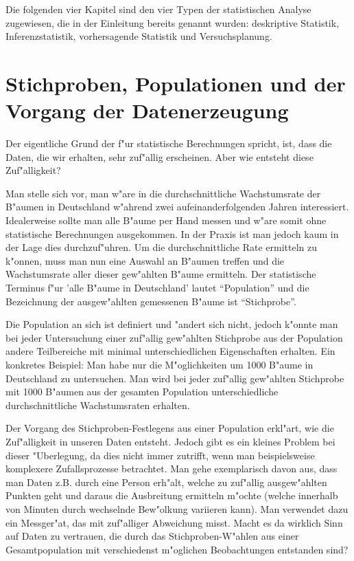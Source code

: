 \documentclass[a4paper,twoside]{tufte-book}\usepackage[]{graphicx}\usepackage[]{color}
\begin{document}
	Die folgenden vier Kapitel sind den vier Typen der statistischen Analyse zugewiesen, die in der Einleitung bereits genannt wurden: deskriptive Statistik, Inferenzstatistik, vorhersagende Statistik und Versuchsplanung. 
	
	\section{Stichproben, Populationen und der Vorgang der Datenerzeugung}
	
	Der eigentliche Grund der f"ur statistische Berechnungen spricht, ist, dass die Daten, die wir erhalten, sehr zuf"allig erscheinen. Aber wie entsteht diese Zuf"alligkeit?
	
	Man stelle sich vor,  man w"are in die durchschnittliche Wachstumsrate der B"aumen in Deutschland w"ahrend zwei aufeinanderfolgenden Jahren interessiert. Idealerweise sollte man alle B"aume per Hand messen und w"are somit ohne statistische Berechnungen ausgekommen. In der Praxis ist man jedoch kaum in der Lage dies durchzuf"uhren. Um die durchschnittliche Rate ermitteln zu k"onnen, muss man nun eine Auswahl an B"aumen treffen und die Wachstumsrate aller dieser gew"ahlten B"aume ermitteln. Der statistische Terminus f"ur 'alle B"aume in Deutschland' lautet "`Population"' und die Bezeichnung der ausgew"ahlten gemessenen B"aume ist "`Stichprobe"'.
	
	Die  Population an sich ist definiert und "andert sich nicht, jedoch k"onnte man bei jeder Untersuchung einer zuf"allig gew"ahlten Stichprobe aus der Population andere Teilbereiche mit minimal unterschiedlichen Eigenschaften erhalten. Ein konkretes Beispiel: Man habe nur die M"oglichkeiten um 1000 B"aume in Deutschland zu untersuchen. Man wird bei jeder zuf"allig gew"ahlten Stichprobe mit 1000 B"aumen aus der gesamten Population unterschiedliche durchschnittliche Wachstumsraten erhalten.
	
	Der Vorgang des Stichproben-Festlegens aus einer Population erkl"art, wie die Zuf"alligkeit in unseren Daten entsteht. Jedoch gibt es ein kleines Problem bei dieser "Uberlegung, da dies nicht immer zutrifft, wenn man beispielsweise komplexere Zufallsprozesse betrachtet. Man gehe exemplarisch davon aus, dass man Daten z.B. durch eine Person erh"alt, welche zu zuf"allig ausgew"ahlten Punkten geht und daraus die Ausbreitung ermitteln m"ochte (welche innerhalb von Minuten durch wechselnde Bew"olkung variieren kann). Man verwendet dazu ein Messger"at, das mit zuf"alliger Abweichung misst. Macht es da wirklich Sinn auf Daten zu vertrauen, die durch das Stichproben-W"ahlen aus einer Gesamtpopulation mit verschiedenst m"oglichen Beobachtungen entstanden sind?
	
\end{document}
